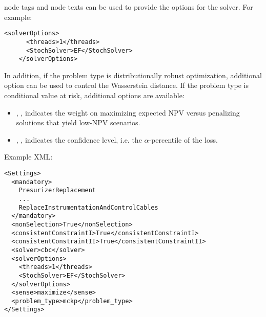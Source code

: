 \begin{itemize}
  node tags and node texts can be used to provide the options for the solver. For example:
  \begin{lstlisting}[style=XML]
    <solverOptions>
      <threads>1</threads>
      <StochSolver>EF</StochSolver>
    </solverOptions>
  \end{lstlisting}
  In addition, if the problem type is distributionally robust optimization, additional option
   can be used to control the Wasserstein distance.
  If the problem type is conditional value at risk, additional options are available:
  \begin{itemize}
    \item {}, , indicates the weight on
    maximizing expected NPV versus penalizing solutions that yield low-NPV scenarios.
    \item {}, ,  indicates
    the confidence level, i.e. the $\alpha$-percentile of the loss.
  \end{itemize}
\end{itemize}

Example XML:
\begin{lstlisting}[style=XML]
<Settings>
  <mandatory>
    PresurizerReplacement
    ...
    ReplaceInstrumentationAndControlCables
  </mandatory>
  <nonSelection>True</nonSelection>
  <consistentConstraintI>True</consistentConstraintI>
  <consistentConstraintII>True</consistentConstraintII>
  <solver>cbc</solver>
  <solverOptions>
    <threads>1</threads>
    <StochSolver>EF</StochSolver>
  </solverOptions>
  <sense>maximize</sense>
  <problem_type>mckp</problem_type>
</Settings>
\end{lstlisting}

